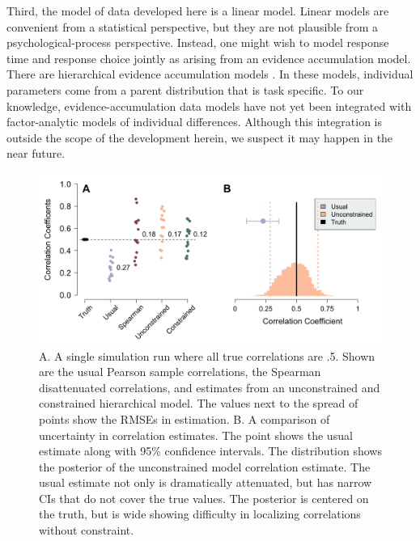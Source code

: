 \documentclass[man, 12pt]{apa7} %
\begin{document}
Third, the model of data developed here is a linear model.  Linear models are convenient from a statistical perspective, but they are not plausible from a psychological-process perspective.  Instead, one might wish to model response time and response choice jointly as arising from an evidence accumulation model.  There are hierarchical evidence accumulation models \parencite[]{Vandekerckhove.etal.2011, Wiecki.etal.2013}.  In these models, individual parameters come from a parent distribution that is task specific.  To our knowledge, evidence-accumulation data models have not yet been integrated with factor-analytic models of individual differences.  Although this integration is outside the scope of the development herein, we suspect it may happen in the near future.










\printbibliography


\begin{figure}[htbp]
    \centering  %
    \includegraphics[width=\linewidth, height=1\linewidth, keepaspectratio]{_figs/prob_setupAll.png}
    \caption{A. A single simulation run where all true correlations are .5.  Shown are the usual Pearson sample correlations, the Spearman disattenuated correlations, and estimates from an unconstrained and constrained hierarchical model.  The values next to the spread of points show the RMSEs in estimation.  B. A comparison of uncertainty in correlation estimates.   The point shows the usual estimate along with 95\% confidence intervals.  The distribution shows the posterior of the unconstrained model correlation estimate.  The usual estimate not only is dramatically attenuated, but has narrow CIs that do not cover the true values.  The posterior is centered on the truth, but is wide showing difficulty in localizing correlations without constraint.}  
    \label{fig:prob_setup}
\end{figure}
\end{document}
